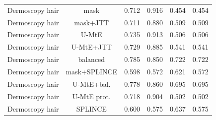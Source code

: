 {\begin{longtable}{lccccc}
Dermoscopy hair & mask & 0.712 & 0.916 & 0.454 & 0.454 \\
Dermoscopy hair & mask+JTT & 0.711 & 0.880 & 0.509 & 0.509 \\
Dermoscopy hair & U-MtE & 0.735 & 0.913 & 0.506 & 0.506 \\
Dermoscopy hair & U-MtE+JTT & 0.729 & 0.885 & 0.541 & 0.541 \\
Dermoscopy hair & balanced & 0.785 & 0.850 & 0.722 & 0.722 \\
Dermoscopy hair & mask+SPLINCE & 0.598 & 0.572 & 0.621 & 0.572 \\
Dermoscopy hair & U-MtE+bal. & 0.778 & 0.860 & 0.695 & 0.695 \\
Dermoscopy hair & U-MtE prot. & 0.718 & 0.904 & 0.502 & 0.502 \\
Dermoscopy hair & SPLINCE & 0.600 & 0.575 & 0.637 & 0.575 \\
\end{longtable}}
